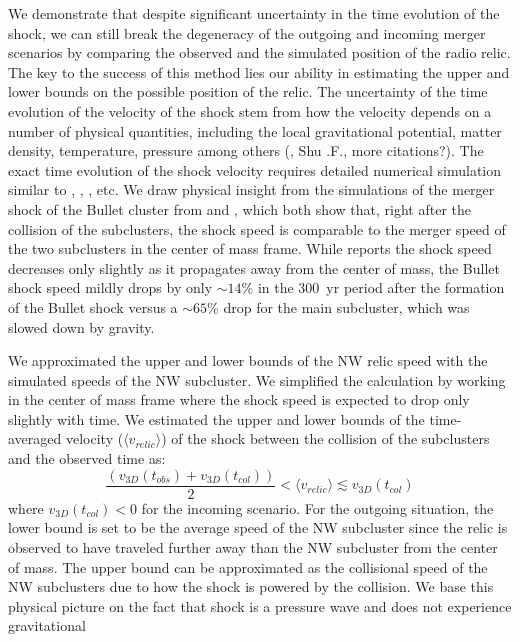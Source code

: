 We demonstrate that despite significant uncertainty in the time
evolution of the shock, we can still break the degeneracy of the
outgoing and incoming merger scenarios by comparing the observed and the
simulated position of the radio relic.
The key to the success of this method lies our ability in estimating the
upper and lower bounds on the possible position of the relic. The
uncertainty of the time evolution of the velocity of the shock stem from
how the velocity depends on a number of physical quantities, including the
local gravitational potential, matter density, temperature, pressure among
others (\citealt{E98}, Shu .F., more citations?).  The exact time evolution
of the shock velocity requires detailed numerical simulation similar to
\citet{Springel2007}, \citet{Vazza11}, \citet{Kang2007}, etc. 
We draw physical insight from the simulations of the merger shock of the
Bullet cluster from \citet{Springel2007} and \citet{Paul2011b}, which both show
that, right after the collision of the subclusters, the shock speed is
comparable to the merger speed of the two subclusters in the center of mass
frame.  While \citet{Paul2011b} reports the shock speed decreases only
slightly as it propagates away from the center of mass, the Bullet shock
speed mildly drops by only $\sim 14\%$ in the 300~\mega yr period after the
formation of the Bullet shock versus a $\sim65\%$ drop for the main
subcluster, which was slowed down by gravity. \par 
We approximated the upper and lower bounds of the NW relic speed with the
simulated speeds of the NW subcluster.  We simplified the calculation by
working in the center of mass frame where the shock speed is expected to
drop only slightly with time. We estimated the upper and lower bounds of the
time-averaged velocity ($\langle v_{relic} \rangle$) of the shock between
the collision of the subclusters and the observed time as:  
\begin{equation}
	\frac{(v_{3D}(t_{obs}) + v_{3D}(t_{col}))}{2}	< \langle v_{relic} \rangle \lesssim v_{3D}(t_{col}) 
\end{equation}
where $v_{3D}(t_{col}) < 0 $ for the incoming scenario. 
For the outgoing situation, the lower bound is set to be the average speed
of the NW subcluster since the relic is observed to have traveled further
away than the NW subcluster from the center of mass. The upper bound can be
approximated as the collisional speed of the NW subclusters due to how the
shock is powered by the collision. We base this physical picture on the
fact that shock is a pressure wave and does not experience gravitational
